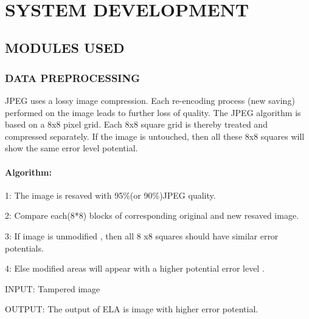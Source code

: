 \usepackage{amsmath}
\usepackage{amsfonts}
\
\chapter{SYSTEM DEVELOPMENT} %
\section{MODULES USED}
\subsection{DATA PREPROCESSING}
JPEG uses a lossy image compression. Each re-encoding process (new saving) performed on the image leads to further loss of quality. The JPEG algorithm is based on a 8x8 pixel grid. Each 8x8 square grid is thereby treated and compressed separately. If the image is untouched, then all these 8x8 squares will show the same error level potential.  
\subsubsection{Algorithm:} 

1: The image is resaved with 95\%(or 90\%)JPEG quality.

2: Compare each(8*8) blocks of corresponding original and new resaved image. 

3: If image is unmodified , then all 8 x8 squares should have similar error potentials.

4: Else modified areas will appear with a higher potential error level . 

INPUT: Tampered image

OUTPUT: The output of ELA is image with higher error potential.

